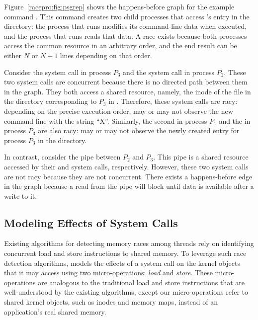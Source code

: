 Figure~\ref{racepro:fig:psgrep} shows the happens-before graph for the example
command .  This command creates two child processes
that access 's entry in the  directory: the process
that runs  modifies its command-line data when executed, and
the process that runs  reads that data.  A race exists because
both processes access the common resource in an arbitrary order, and
the end result can be either $N$ or $N+1$ lines depending on that order.

Consider the  system call in process $P_3$ and the
 system call in process $P_2$. These two system calls are
concurrent because there is no directed path between them in the
graph. They both access a shared resource, namely, the inode of the
file  in the directory corresponding to $P_3$ in
.  Therefore, these system calls are racy: depending on the
precise execution order,  may or may not observe the new
command line with the string ``X''. Similarly, the second 
in process $P_1$ and the  in process $P_3$ are also racy: 
 may or may not observe the newly created entry for
process $P_3$ in the  directory.

In contrast, consider the pipe between $P_2$ and $P_3$. This pipe is a
shared resource accessed by their  and  system calls,
respectively.  However, these two system calls are not racy because
they are not concurrent.  There exists a happens-before edge in the
graph because a read from the pipe will block until data is available
after a write to it.

\subsection{Modeling Effects of System Calls} \label{racepro:sec:model}

Existing algorithms for detecting memory races among threads rely on
identifying concurrent load and store instructions to shared memory.
To leverage such race detection algorithms, \racepro models the effects of
a system call on the kernel objects that it may access using two
micro-operations: \emph{load} and \emph{store}. These micro-operations
are analogous to the traditional load and store instructions that are
well-understood by the existing algorithms, except our micro-operations
refer to shared kernel objects, such as inodes and memory maps,
instead of an application's real shared memory.

